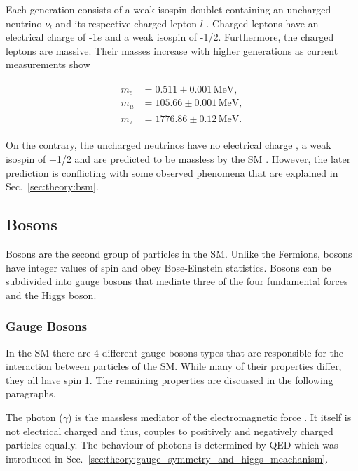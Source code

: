 \documentclass[bachelor,ngerman,english]{GAUBM}
\begin{document}
Each generation consists of a weak isospin doublet containing an uncharged neutrino $\nu_l$ and its respective charged lepton $l$ \cite{theory:general_sm}. Charged leptons have an electrical charge of -1$e$ and a weak isospin of -1/2. Furthermore, the charged leptons are massive. Their masses increase with higher generations as current measurements \cite{pdg} show

\begin{gather}
    \begin{aligned}
        m_e     &=0.511\pm0.001\,\text{MeV},\\
        m_\mu   &=105.66\pm0.001\,\text{MeV},\\
        m_\tau  &=1776.86\pm0.12\,\text{MeV}.
        \label{eq:mass_leptons}
    \end{aligned}
\end{gather}

On the contrary, the uncharged neutrinos have no electrical charge \cite{pdg}, a weak isospin of +1/2 and are predicted to be massless by the SM \cite{theory:general_sm}. However, the later prediction is conflicting with some observed phenomena that are explained in Sec.~\ref{sec:theory:bsm}.


\subsection*{Bosons}
Bosons are the second group of particles in the SM. Unlike the Fermions, bosons have integer values of spin and obey Bose-Einstein statistics. Bosons can be subdivided into gauge bosons that mediate three of the four fundamental forces and the Higgs boson. %

\subsubsection*{Gauge Bosons}
In the SM there are 4 different gauge bosons types \cite{theory:general_sm} that are responsible for the interaction between particles of the SM. While many of their properties differ, they all have spin 1. The remaining properties are discussed in the following paragraphs.  

The photon ($\gamma$) is the massless mediator of the electromagnetic force \cite{theory:qed_02,theory:qed_04,theory:qed_05}. It itself is not electrical charged and thus, couples to positively and negatively charged particles equally. The behaviour of photons is determined by QED which was introduced in Sec.~\ref{sec:theory:gauge_symmetry_and_higgs_meachanism}.
\end{document}
